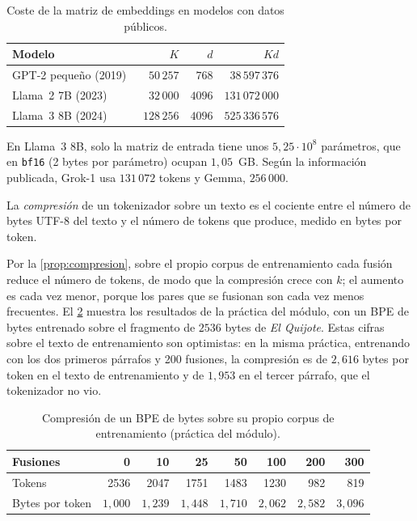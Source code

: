 \begin{table}[h]
\centering\small
\caption{Coste de la matriz de embeddings en modelos con datos públicos.}\label{tab:vocab-modelos}
\begin{tabular}{@{}lrrr@{}}
\toprule
Modelo & $K$ & $d$ & $Kd$ \\
\midrule
GPT-2 pequeño (2019)~\cite{gpt2} & $50\,257$ & $768$ & $38\,597\,376$ \\
Llama~2 7B (2023)~\cite{llama2} & $32\,000$ & $4096$ & $131\,072\,000$ \\
Llama~3 8B (2024)~\cite{llama3} & $128\,256$ & $4096$ & $525\,336\,576$ \\
\bottomrule
\end{tabular}
\end{table}

En Llama~3 8B, solo la matriz de entrada tiene unos $5{,}25\cdot 10^{8}$ parámetros, que en \texttt{bf16} (2 bytes por parámetro) ocupan $1{,}05$~GB. Según la información publicada, Grok-1 usa $131\,072$ tokens y Gemma, $256\,000$.

\begin{definicion}[Compresión]
La \emph{compresión} de un tokenizador sobre un texto es el cociente entre el número de bytes UTF-8 del texto y el número de tokens que produce, medido en bytes por token.
\end{definicion}

Por la \cref{prop:compresion}, sobre el propio corpus de entrenamiento cada fusión reduce el número de tokens, de modo que la compresión crece con $k$; el aumento es cada vez menor, porque los pares que se fusionan son cada vez menos frecuentes. El \cref{tab:compresion} muestra los resultados de la práctica del módulo, con un BPE de bytes entrenado sobre el fragmento de $2536$ bytes de \emph{El Quijote}. Estas cifras sobre el texto de entrenamiento son optimistas: en la misma práctica, entrenando con los dos primeros párrafos y 200 fusiones, la compresión es de $2{,}616$ bytes por token en el texto de entrenamiento y de $1{,}953$ en el tercer párrafo, que el tokenizador no vio.

\begin{table}[h]
\centering\small
\caption{Compresión de un BPE de bytes sobre su propio corpus de entrenamiento (práctica del módulo).}\label{tab:compresion}
\begin{tabular}{@{}lrrrrrrr@{}}
\toprule
Fusiones & 0 & 10 & 25 & 50 & 100 & 200 & 300 \\
\midrule
Tokens & 2536 & 2047 & 1751 & 1483 & 1230 & 982 & 819 \\
Bytes por token & $1{,}000$ & $1{,}239$ & $1{,}448$ & $1{,}710$ & $2{,}062$ & $2{,}582$ & $3{,}096$ \\
\bottomrule
\end{tabular}
\end{table}

